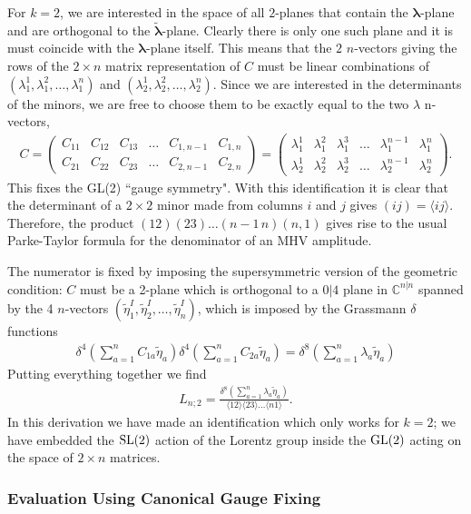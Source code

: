 \documentclass[12pt]{article}
\newcommand{\be}{\begin{eqnarray}}
\newcommand{\ee}{\end{eqnarray}}
\begin{document}
For $k=2$, we are interested in the space of all $2$-planes that contain the $\boldsymbol{\lambda}$-plane and are orthogonal to the $\boldsymbol{\tilde\lambda}$-plane. Clearly there is only one such plane and it is must coincide with the $\boldsymbol{\lambda}$-plane itself. This means that the $2$ $n$-vectors giving the rows of the $2\times n$ matrix representation of $C$ must be linear combinations of $(\lambda^{1}_1,\lambda^2_1,\ldots, \lambda^n_1)$ and $(\lambda^1_2,\lambda^2_2,\ldots, \lambda^n_2)$. Since we are interested in the determinants of the minors, we are free to choose them to be exactly equal to the two $\lambda$ n-vectors,
%
\be
C = \left(\begin{array}{cccccc} C_{11} & C_{12} & C_{13} & \ldots & C_{1,n-1} & C_{1,n} \\ C_{21} & C_{22} & C_{23} & \ldots & C_{2,n-1} & C_{2,n}
\end{array}\right) = \left(\begin{array}{cccccc} \lambda^1_1 & \lambda^2_1 & \lambda^{3}_1 & \ldots & \lambda^{n-1}_1 & \lambda^n_1 \\ \lambda^1_2 & \lambda^2_2 & \lambda^3_2 & \ldots & \lambda^{n-1}_2 & \lambda^n_2
\end{array}\right).
\ee
%
This fixes the GL(2) ``gauge symmetry".
With this identification it is clear that the determinant of a $2\times 2$ minor made from columns $i$ and $j$ gives $(ij) = \langle i j \rangle$. Therefore, the product $(12)(23)\ldots (n-1 \, n)(n,1)$ gives rise to the usual Parke-Taylor formula for the denominator of an MHV amplitude.

The numerator is fixed by imposing the supersymmetric version of the geometric condition: $C$ must be a 2-plane which is orthogonal to a $0|4$ plane in $\mathbb{C}^{n|n}$ spanned by the 4 $n$-vectors $(\tilde\eta_1^I, \tilde\eta_2^I,\ldots, \tilde\eta_n^I)$, which is imposed by the Grassmann $\delta$ functions
%
\be
\delta^4 (\sum_{a=1}^n C_{1a}\tilde\eta_a)\delta^4(\sum_{a=1}^nC_{2a}\tilde\eta_a) = \delta^8(\sum_{a=1}^n \lambda_a\tilde\eta_a)
\ee
%
Putting everything together we find
%
\be
L_{n;2} = \frac{\delta^8(\sum_{a=1}^n \lambda_a\tilde\eta_a)}{\langle 1 2 \rangle \langle 2 3 \rangle\ldots \langle n 1\rangle}.
\ee
In this derivation we have made an identification which only works for $k=2$; we have embedded the ${\rm SL}(2)$ action of the Lorentz group inside the ${\rm GL}(2)$ acting on the space of $2\times n$ matrices.

\subsubsection{Evaluation Using Canonical Gauge Fixing}
\end{document}
